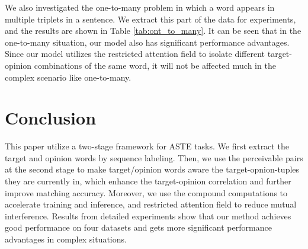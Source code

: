 \documentclass[11pt]{article}
\begin{document}
We also investigated the one-to-many problem in which a word appears in multiple triplets in a sentence. We extract this part of the data for experiments, and the results are shown in Table \ref{tab:ont_to_many}. It can be seen that in the one-to-many situation, our model also has significant performance advantages. Since our model utilizes the restricted attention field to isolate different target-opinion combinations of the same word, it will not be affected much in the complex scenario like one-to-many. \section{Conclusion}
This paper utilize a two-stage framework for ASTE tasks. We first extract the target and opinion words by sequence labeling. 
Then, we use the perceivable pairs at the second stage to make target/opinion words aware the target-opnion-tuples they are currently in, which enhance the target-opinion correlation and further improve matching accuracy.
Moreover, we use the compound computations to accelerate training and inference, and restricted attention field to reduce mutual interference. Results from detailed experiments show that our method achieves good performance on four datasets and gets more significant performance advantages in complex situations. 


\end{document}
